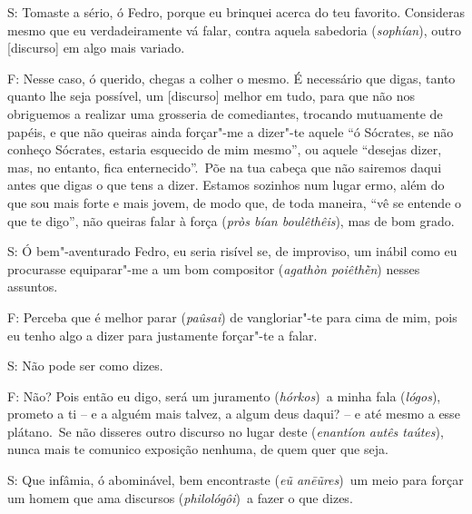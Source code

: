 S: Tomaste a sério, ó Fedro, porque eu brinquei acerca do teu favorito.
Consideras mesmo que eu verdadeiramente vá falar, contra aquela
sabedoria (\emph{sophían}), outro [discurso] em algo mais variado.

F: Nesse caso, ó querido, chegas a colher o mesmo. \bekker{[236c]} É
necessário que digas, tanto quanto lhe seja possível, um [discurso]
melhor em tudo, para que não nos obriguemos a realizar uma grosseria de
comediantes, trocando mutuamente de papéis, e que não queiras ainda
forçar"-me a dizer"-te aquele ``ó Sócrates, se não conheço Sócrates,
estaria esquecido de mim mesmo'', ou aquele ``desejas dizer, mas, no
entanto, fica enternecido''.~Põe na tua cabeça que não sairemos daqui
antes que digas o que tens a dizer. Estamos sozinhos num lugar ermo,
além do que sou mais forte e mais jovem, de modo que, de toda maneira,
``vê se entende o que te digo'', não queiras falar à força (\emph{pròs
bían boulêthêis}), mas de bom grado.

\bekker{[236d]} S: Ó bem"-aventurado Fedro, eu seria risível se, de improviso,
um inábil como eu procurasse equiparar"-me a um bom compositor
(\emph{agathòn poiêthḕn}) nesses assuntos.

F: Perceba que é melhor parar (\emph{paûsai}) de vangloriar"-te para cima
de mim, pois eu tenho algo a dizer para justamente forçar"-te a falar.

 

S: Não pode ser como dizes.

F: Não? Pois então eu digo, será um juramento (\emph{hórkos})\emph{~}a
minha fala (\emph{lógos}), prometo a ti -- e a alguém mais talvez, a
algum deus daqui? -- \bekker{[236e]} e até mesmo a esse plátano.~Se não
disseres outro discurso no lugar deste (\emph{enantíon autês taútes}),
nunca mais te comunico exposição nenhuma, de quem quer que seja.

S: Que infâmia, ó abominável, bem encontraste (\emph{eũ anēũres})~um meio para forçar um homem que ama discursos
(\emph{philológôi})~a fazer o que dizes.

